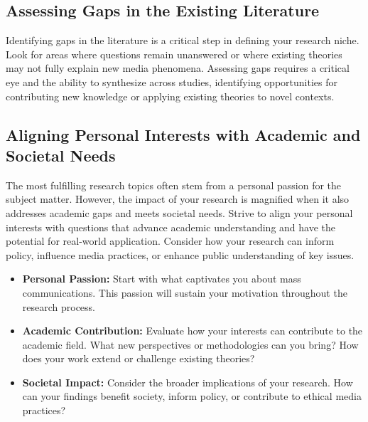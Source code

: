 \documentclass[
]{book}
\begin{document}
\hypertarget{assessing-gaps-in-the-existing-literature}{%
\subsection*{Assessing Gaps in the Existing Literature}\label{assessing-gaps-in-the-existing-literature}}

Identifying gaps in the literature is a critical step in defining your research niche. Look for areas where questions remain unanswered or where existing theories may not fully explain new media phenomena. Assessing gaps requires a critical eye and the ability to synthesize across studies, identifying opportunities for contributing new knowledge or applying existing theories to novel contexts.

\hypertarget{aligning-personal-interests-with-academic-and-societal-needs}{%
\subsection*{Aligning Personal Interests with Academic and Societal Needs}\label{aligning-personal-interests-with-academic-and-societal-needs}}

The most fulfilling research topics often stem from a personal passion for the subject matter. However, the impact of your research is magnified when it also addresses academic gaps and meets societal needs. Strive to align your personal interests with questions that advance academic understanding and have the potential for real-world application. Consider how your research can inform policy, influence media practices, or enhance public understanding of key issues.

\begin{itemize}
\item
  \textbf{Personal Passion:} Start with what captivates you about mass communications. This passion will sustain your motivation throughout the research process.
\item
  \textbf{Academic Contribution:} Evaluate how your interests can contribute to the academic field. What new perspectives or methodologies can you bring? How does your work extend or challenge existing theories?
\item
  \textbf{Societal Impact:} Consider the broader implications of your research. How can your findings benefit society, inform policy, or contribute to ethical media practices?
\end{itemize}
\end{document}
